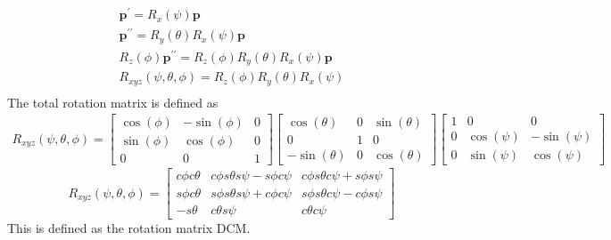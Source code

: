 \begin{equation}
\begin{gathered}
\boldsymbol{p}^{\prime}=R_{x}(\psi) \boldsymbol{p} \\
\boldsymbol{p}^{\prime \prime}=R_{y}(\theta) R_{x}(\psi) \boldsymbol{p} \\
R_{z}(\phi) \boldsymbol{p}^{\prime \prime}=R_{z}(\phi) R_{y}(\theta) R_{x}(\psi) \boldsymbol{p} \\
R_{x y z}(\psi, \theta, \phi)=R_{z}(\phi) R_{y}(\theta) R_{x}(\psi) \\
\end{gathered}
\end{equation}
The total rotation matrix is defined as
\begin{equation*}
\begin{gathered}
R_{x y z}(\psi, \theta, \phi)=\left[\begin{array}{cccc}
\cos (\phi) & -\sin (\phi) & 0 \\
\sin (\phi) & \cos (\phi) & 0 \\
0 & 0 & 1
\end{array}\right]\left[\begin{array}{ccc}
\cos (\theta) & 0 & \sin (\theta) \\
0 & 1 & 0 \\
-\sin (\theta) & 0 & \cos (\theta)
\end{array}\right]\left[\begin{array}{ccc}
1 & 0 & 0 \\
0 & \cos (\psi) & -\sin (\psi) \\
0 & \sin (\psi) & \cos (\psi)
\end{array}\right]
\end{gathered}
\end{equation*}
\begin{equation}
R_{x y z}(\psi, \theta, \phi)=\left[\begin{array}{ccc}
c \phi c \theta & c \phi s \theta s \psi-s \phi c \psi & c \phi s \theta c \psi+s \phi s \psi \\
s \phi c \theta & s \phi s \theta s \psi+c \phi c \psi & s \phi s \theta c \psi-c \phi s \psi \\
-s \theta & c \theta s \psi & c \theta c \psi
\end{array}\right]
\end{equation}
This is defined as the rotation matrix DCM.

